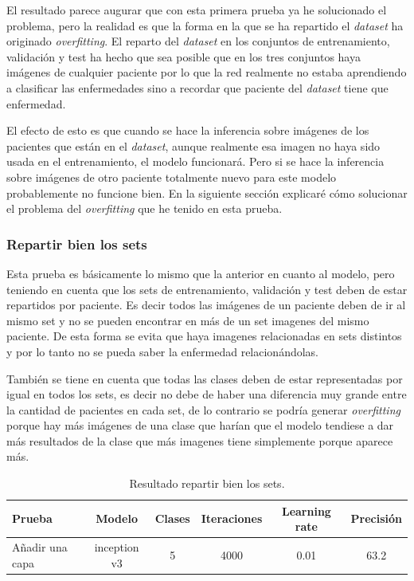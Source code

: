 \documentclass[12pt,a4paper]{article}
\begin{document}
El resultado parece augurar que con esta primera prueba ya he solucionado el problema, pero la realidad es que la forma en la que se ha repartido el \textit{dataset} ha originado \textit{overfitting}. El reparto del \textit{dataset} en los conjuntos de entrenamiento, validación y test ha hecho que sea posible que en los tres conjuntos haya imágenes de cualquier paciente por lo que la red realmente no estaba aprendiendo a clasificar las enfermedades sino a recordar que paciente del \textit{dataset} tiene que enfermedad.
\bigskip

El efecto de esto es que cuando se hace la inferencia sobre imágenes de los pacientes que están en el \textit{dataset}, aunque realmente esa imagen no haya sido usada en el entrenamiento, el modelo funcionará. Pero si se hace la inferencia sobre imágenes de otro paciente totalmente nuevo para este modelo probablemente no funcione bien. En la siguiente sección explicaré cómo solucionar el problema del \textit{overfitting} que he tenido en esta prueba.

\subsubsection{Repartir bien los sets}
Esta prueba es básicamente lo mismo que la anterior en cuanto al modelo, pero teniendo en cuenta que los sets de entrenamiento, validación y test deben de estar repartidos por paciente. Es decir todos las imágenes de un paciente deben de ir al mismo set y no se pueden encontrar en más de un set imagenes del mismo paciente. De esta forma se evita que haya imagenes relacionadas en sets distintos y por lo tanto no se pueda saber la enfermedad relacionándolas.
\bigskip

También se tiene en cuenta que todas las clases deben de estar representadas por igual en todos los sets, es decir no debe de haber una diferencia muy grande entre la cantidad de pacientes en cada set, de lo contrario se podría generar \textit{overfitting} porque hay más imágenes de una clase que harían que el modelo tendiese a dar más resultados de la clase que más imagenes tiene simplemente porque aparece más.

\begin{table}[H]
\centering
\begin{tabular}{|l|c|c|c|c|c|}
\hline
\textbf{Prueba} & \textbf{Modelo} & \textbf{Clases} & \textbf{Iteraciones} & \textbf{Learning rate} & \textbf{Precisión} \\ \hline
Añadir una capa & inception v3    & 5               & 4000                 & 0.01                   & 63.2               \\ \hline
\end{tabular}
\caption{Resultado repartir bien los sets.}
\end{table}
\end{document}
